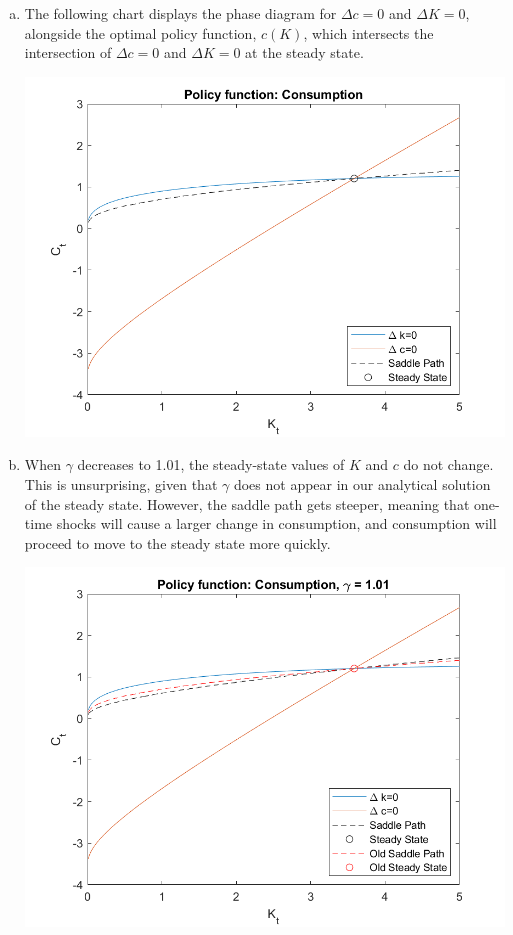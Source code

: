 \documentclass{article}
\begin{document}
\begin{enumerate}[(a)]
	\item The following chart displays the phase diagram for ${\Delta c=0}$ and ${\Delta K=0}$, alongside the optimal policy function, $c(K)$, which intersects the intersection of ${\Delta c=0}$ and ${\Delta K=0}$ at the steady state.
		\begin{center}
			\includegraphics[scale = .8]{figure1.png}
		\end{center}
	
\pagebreak
	\item When $\gamma$ decreases to 1.01, the steady-state values of $K$ and $c$ do not change. This is unsurprising, given that $\gamma$ does not appear in our analytical solution of the steady state. However, the saddle path gets steeper, meaning that one-time shocks will cause a larger change in consumption, and consumption will proceed to move to the steady state more quickly.
		\begin{center}
			\includegraphics[scale = .8]{figure2.png}
		\end{center}
	

\end{enumerate}
\end{document}

